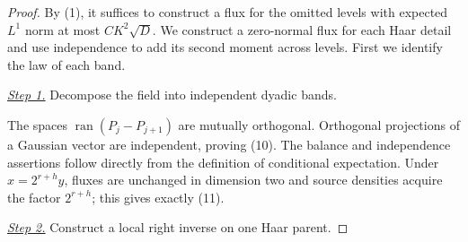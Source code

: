 \documentclass{smfart}
\theoremstyle{definition}
\newcommand{\1}{\mathbf 1}
\begin{document}
\begin{proof}
By (1), it suffices to construct a flux for the omitted levels with
expected $L^1$ norm at most $CK^2\sqrt D$.  We construct a zero-normal
flux for each Haar detail and use independence to add its second moment
across levels.  First we identify the law of each band.

\smallskip\noindent
\underline{\textit{Step 1.}} Decompose the field into independent dyadic bands.

The spaces $\operatorname {ran}(P_ j-P_ {j+1})$ are mutually orthogonal.
Orthogonal projections of a Gaussian vector are independent, proving
(10). The balance and independence assertions follow directly from the
definition of conditional expectation. Under $x=2^{r+h}y$, fluxes are
unchanged in dimension two and source densities acquire the factor
$2^{r+h}$; this gives exactly (11).

\smallskip\noindent
\underline{\textit{Step 2.}} Construct a local right inverse on one Haar parent.


\end{proof}
\end{document}
